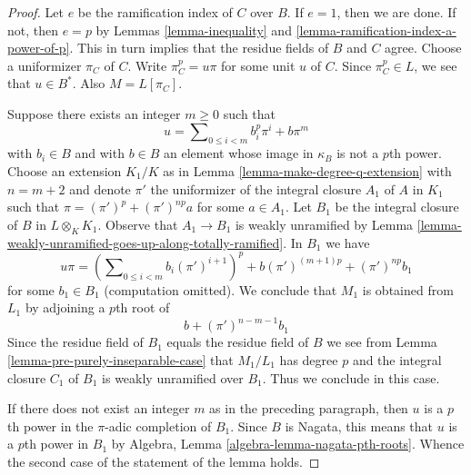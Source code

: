 \documentclass[10pt,a4paper]{amsart}
\theoremstyle{plain}
\theoremstyle{definition}
\theoremstyle{remark}
\numberwithin{equation}{subsection}
\begin{document}
\begin{proof}
Let $e$ be the ramification index of $C$ over $B$. If $e = 1$, then we are
done. If not, then $e = p$ by Lemmas \ref{lemma-inequality} and
\ref{lemma-ramification-index-a-power-of-p}.
This in turn implies that the residue fields of $B$ and $C$ agree.
Choose a uniformizer $\pi_C$ of $C$.
Write $\pi_C^p = u \pi$ for some unit $u$ of $C$.
Since $\pi_C^p \in L$, we see that $u \in B^*$. Also $M = L[\pi_C]$.

\medskip\noindent
Suppose there exists an integer $m \geq 0$ such that
$$
u = \sum\nolimits_{0 \leq i < m} b_i^p \pi^i + b \pi^m
$$
with $b_i \in B$ and with $b \in B$ an element whose image in $\kappa_B$
is not a $p$th power. Choose an extension $K_1/K$ as in
Lemma \ref{lemma-make-degree-q-extension}
with $n = m + 2$ and denote $\pi'$ the uniformizer
of the integral closure $A_1$ of $A$ in $K_1$ such that
$\pi = (\pi')^p + (\pi')^{np} a$ for some $a \in A_1$.
Let $B_1$ be the integral closure of $B$ in $L \otimes_K K_1$.
Observe that $A_1 \to B_1$ is weakly unramified by
Lemma \ref{lemma-weakly-unramified-goes-up-along-totally-ramified}.
In $B_1$ we have
$$
u \pi =
\left(\sum\nolimits_{0 \leq i < m} b_i (\pi')^{i + 1}\right)^p +
b (\pi')^{(m + 1)p} + (\pi')^{np} b_1
$$
for some $b_1 \in B_1$ (computation omitted).
We conclude that $M_1$ is obtained from
$L_1$ by adjoining a $p$th root of
$$
b + (\pi')^{n - m - 1} b_1
$$
Since the residue field of $B_1$ equals the residue field of $B$
we see from Lemma \ref{lemma-pre-purely-inseparable-case}
that $M_1/L_1$ has degree $p$ and
the integral closure $C_1$ of $B_1$ is weakly unramified over $B_1$.
Thus we conclude in this case.

\medskip\noindent
If there does not exist an integer $m$ as in the preceding paragraph,
then $u$ is a $p$th power in the $\pi$-adic completion of $B_1$.
Since $B$ is Nagata, this means that $u$ is a $p$th power in $B_1$
by Algebra, Lemma \ref{algebra-lemma-nagata-pth-roots}.
Whence the second case of the statement of the lemma holds.
\end{proof}
\end{document}
